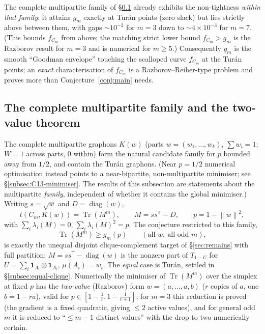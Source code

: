 \documentclass[11pt]{article}
\newcommand{\one}{\mathbf 1}
\newcommand{\Tr}{\operatorname{Tr}}
\newcommand{\norm}[1]{\left\|#1\right\|}
\begin{document}
The complete multipartite family of \S\ref{subsec:multipartite} already exhibits the non-tightness \emph{within that family}: it attains $g_m$ exactly at Tur\'an points (zero slack) but lies strictly above between them, with gaps $\sim10^{-2}$ for $m=3$ down to $\sim4\times10^{-3}$ for $m=7$.  (This bounds $f_{C_m}$ from above; the matching strict lower bound $f_{C_m}>g_m$ is the Razborov result for $m=3$ and is numerical for $m\ge5$.)  Consequently $g_m$ is the smooth ``Goodman envelope'' touching the scalloped curve $f_{C_m}$ at the Tur\'an points; an \emph{exact} characterisation of $f_{C_m}$ is a Razborov--Reiher-type problem and proves more than Conjecture~\ref{conj:main} needs.

\subsection{The complete multipartite family and the two-value theorem}\label{subsec:multipartite}

The complete multipartite graphons $K(w)$ (parts $w=(w_1,\dots,w_k)$, $\sum w_i=1$; $W=1$ across parts, $0$ within) form the natural candidate family for $p$ bounded away from $1/2$, and contain the Tur\'an graphons.  (Near $p=1/2$ numerical optimisation instead points to a near-bipartite, non-multipartite minimiser; see \S\ref{subsec:C13-minimiser}.  The results of this subsection are statements about the multipartite \emph{family}, independent of whether it contains the global minimiser.)  Writing $s=\sqrt w$ and $D=\operatorname{diag}(w)$,
\begin{equation}\label{eq:multipartite-trace}
        t(C_m,K(w))=\Tr(M^m),\qquad M=ss^{\mathsf T}-D,\qquad p=1-\norm w^2,
\end{equation}
with $\sum_i\lambda_i(M)=0$, $\sum_i\lambda_i(M)^2=p$.  The conjecture restricted to this family,
\begin{equation}\label{eq:P2}
        \Tr(M^m)\ge g_m(p)\qquad(\text{all }w,\ \text{all odd }m),\tag{P2}
\end{equation}
is exactly the unequal disjoint clique-complement target of \S\ref{sec:remains} with full partition: $M=ss^{\mathsf T}-\operatorname{diag}(w)$ is the nonzero part of $T_{1-U}$ for $U=\sum_i\one_{A_i}\otimes\one_{A_i}$, $\mu(A_i)=w_i$.  The \emph{equal} case is Tur\'an, settled in \S\ref{subsec:equal-clique}.  Numerically the minimiser of $\Tr(M^m)$ over the simplex at fixed $p$ has the \emph{two-value} (Razborov) form $w=(a,\dots,a,b)$ ($r$ copies of $a$, one $b=1-ra$), valid for $p\in[1-\tfrac1r,1-\tfrac1{r+1}]$; for $m=3$ this reduction is proved (the gradient is a fixed quadratic, giving $\le2$ active values), and for general odd $m$ it is reduced to ``$\le m-1$ distinct values'' with the drop to two numerically certain.
\end{document}
